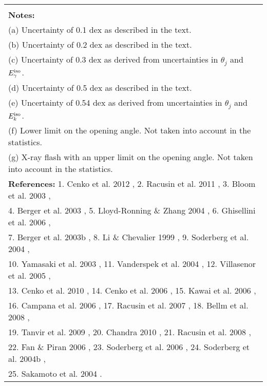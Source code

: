 \documentclass[12pt]{article}
\begin{document}
\begin{landscape}
\begin{longtable}{ccccccccccc}
\hline
\\
\multicolumn{11}{l}{\textbf{Notes:} } \\ 
\multicolumn{11}{l}{(a) Uncertainty of 0.1 dex as described in the text. } \\ 
\multicolumn{11}{l}{(b) Uncertainty of 0.2 dex as described in the text.} \\ 
\multicolumn{11}{l}{(c) Uncertainty of 0.3 dex as derived from uncertainties in $\theta_j$ and $E_\gamma^{\rm iso}$.} \\ 
\multicolumn{11}{l}{(d) Uncertainty of 0.5 dex as described in the text.} \\ 
\multicolumn{11}{l}{(e) Uncertainty of 0.54 dex as derived from uncertainties in $\theta_j$ and $E_k^{\rm iso}$.} \\ 
\multicolumn{11}{l}{(f) Lower limit on the opening angle. Not taken into account in the statistics. } \\ 
\multicolumn{11}{l}{(g) X-ray flash with an upper limit on the opening angle. Not taken into account in the statistics.} \\ 
\multicolumn{11}{l}{\textbf{References:} 1. Cenko et al. 2012 \cite{scenko12}, 2. Racusin et al. 2011 \cite{sracusin11}, 3. Bloom et al. 2003 \cite{sbloom03}, } \\ 
\multicolumn{11}{l}{4. Berger et al. 2003 \cite{sberger03}, 5. Lloyd-Ronning \& Zhang 2004 \cite{slz04}, 6. Ghisellini et al. 2006 \cite{sguise06},  } \\
\multicolumn{11}{l}{7. Berger et al. 2003b \cite{sberger03nat}, 8. Li \& Chevalier 1999 \cite{sli99}, 9. Soderberg et al. 2004 \cite{ssode04}, } \\ 
\multicolumn{11}{l}{10. Yamasaki et al. 2003 \cite{syama03}, 11. Vanderspek et al. 2004 \cite{svander04}, 12. Villasenor et al. 2005 \cite{svilla05}, } \\ 
\multicolumn{11}{l}{13. Cenko et al. 2010 \cite{scenko10}, 14. Cenko et al. 2006 \cite{scenko06}, 15. Kawai et al. 2006 \cite{skawai06}, } \\ 
\multicolumn{11}{l}{16. Campana et al. 2006 \cite{scampana06}, 17. Racusin et al. 2007 \cite{sracusin07}, 18. Bellm et al. 2008 \cite{sbellm08}, } \\
\multicolumn{11}{l}{19. Tanvir et al. 2009 \cite{stanvir09}, 20. Chandra 2010 \cite{schandra10}, 21. Racusin et al. 2008 \cite{sracusin08}, } \\
\multicolumn{11}{l}{22. Fan \& Piran 2006 \cite{sfan06}, 23. Soderberg et al. 2006 \cite{ssode06}, 24. Soderberg et al. 2004b \cite{ssode04apj}, } \\
\multicolumn{11}{l}{25. Sakamoto et al. 2004 \cite{ssaka04}.}
\label{tab:grb}
\end{longtable}
\end{landscape}
\end{document}
